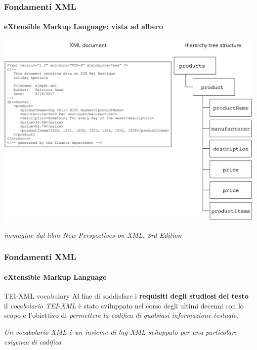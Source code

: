 \begin{frame}
	\frametitle{Fondamenti XML}
	\framesubtitle{eXtensible Markup Language: vista ad albero}
	\addtocounter{nframe}{1}

	\begin{center}
		\includegraphics[width=.9\textwidth]{imgs/XML-TreeStructure.png}
	\end{center}

\begin{tiny}\textit{immagine dal libro New Perspectives on XML, 3rd Edition}\end{tiny}

\end{frame}

\begin{frame}
	\frametitle{Fondamenti XML}
	\framesubtitle{eXtensible Markup Language}
	\addtocounter{nframe}{1}

	\begin{block}{TEI-XML vocabulary}
		Al fine di soddisfare i \textbf{requisiti degli studiosi del testo} il \textit{vocabolario TEI-XML} è stato sviluppato nel corso degli ultimi decenni con lo scopo e l'obiettivo di \textit{permettere la codifica di qualsiasi informazione testuale}.
	\end{block}
	
	\textit{Un vocabolario XML è un insieme di tag XML sviluppato per una particolare esigenza di codifica}

\end{frame}


